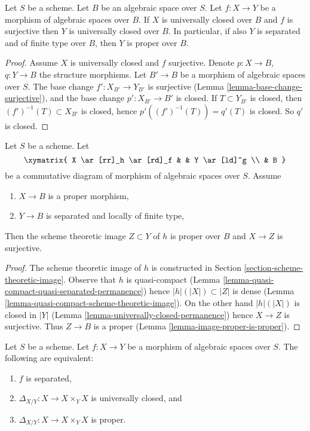 \begin{lemma}
\label{lemma-image-proper-is-proper}
Let $S$ be a scheme. Let $B$ be an algebraic space over $S$.
Let $f : X \to Y$ be a morphism of algebraic spaces over $B$.
If $X$ is universally closed over $B$ and $f$ is surjective then
$Y$ is universally closed over $B$. In particular, if also $Y$ is
separated and of finite type over $B$, then $Y$ is proper over $B$.
\end{lemma}

\begin{proof}
Assume $X$ is universally closed and $f$ surjective.
Denote $p : X \to B$, $q : Y \to B$ the structure morphisms.
Let $B' \to B$ be a morphism of algebraic spaces over $S$.
The base change $f' : X_{B'} \to Y_{B'}$ is surjective
(Lemma \ref{lemma-base-change-surjective}), and the base
change $p' : X_{B'} \to B'$ is closed.
If $T \subset Y_{B'}$ is closed, then $(f')^{-1}(T) \subset X_{B'}$
is closed, hence $p'((f')^{-1}(T)) = q'(T)$ is closed.
So $q'$ is closed.
\end{proof}

\begin{lemma}
\label{lemma-scheme-theoretic-image-is-proper}
Let $S$ be a scheme. Let
$$
\xymatrix{
X \ar[rr]_h \ar[rd]_f & & Y \ar[ld]^g \\
& B
}
$$
be a commutative diagram of morphism of algebraic spaces over $S$.
Assume
\begin{enumerate}
\item $X \to B$ is a proper morphism,
\item $Y \to B$ is separated and locally of finite type,
\end{enumerate}
Then the scheme theoretic image $Z \subset Y$ of $h$
is proper over $B$ and $X \to Z$ is surjective.
\end{lemma}

\begin{proof}
The scheme theoretic image of $h$ is constructed in Section
\ref{section-scheme-theoretic-image}.
Observe that $h$ is quasi-compact
(Lemma \ref{lemma-quasi-compact-quasi-separated-permanence})
hence $|h|(|X|) \subset |Z|$
is dense (Lemma \ref{lemma-quasi-compact-scheme-theoretic-image}).
On the other hand $|h|(|X|)$ is closed in $|Y|$
(Lemma \ref{lemma-universally-closed-permanence})
hence $X \to Z$ is surjective.
Thus $Z \to B$ is a proper (Lemma \ref{lemma-image-proper-is-proper}).
\end{proof}

\begin{lemma}
\label{lemma-separated-diagonal-proper}
Let $S$ be a scheme.
Let $f : X \to Y$ be a morphism of algebraic spaces over $S$.
The following are equivalent:
\begin{enumerate}
\item $f$ is separated,
\item $\Delta_{X/Y} : X \to X \times_Y X$ is universally closed, and
\item $\Delta_{X/Y} : X \to X \times_Y X$ is proper.
\end{enumerate}
\end{lemma}

